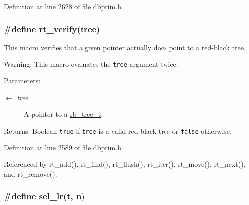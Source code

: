 Definition at line 2628 of file dbprim.h.\hypertarget{group__dbprim__rbtree_ga19}{
\subsubsection[rt\_\-verify]{\setlength{\rightskip}{0pt plus 5cm}\#define rt\_\-verify(tree)}}
\label{group__dbprim__rbtree_ga19}


This macro verifies that a given pointer actually does point to a red-black tree.

\begin{Desc}
\item[Warning:]This macro evaluates the {\tt tree} argument twice.\end{Desc}
\begin{Desc}
\item[Parameters:]
\begin{description}
\item[\mbox{$\leftarrow$} {\em tree}]A pointer to a \hyperlink{group__dbprim__rbtree_ga0}{rb\_\-tree\_\-t}.\end{description}
\end{Desc}
\begin{Desc}
\item[Returns:]Boolean {\tt true} if {\tt tree} is a valid red-black tree or {\tt false} otherwise.\end{Desc}


Definition at line 2589 of file dbprim.h.

Referenced by rt\_\-add(), rt\_\-find(), rt\_\-flush(), rt\_\-iter(), rt\_\-move(), rt\_\-next(), and rt\_\-remove().\hypertarget{group__dbprim__rbtree_ga49}{
\subsubsection[sel\_\-lr]{\setlength{\rightskip}{0pt plus 5cm}\#define sel\_\-lr(t, n)}}
\label{group__dbprim__rbtree_ga49}


